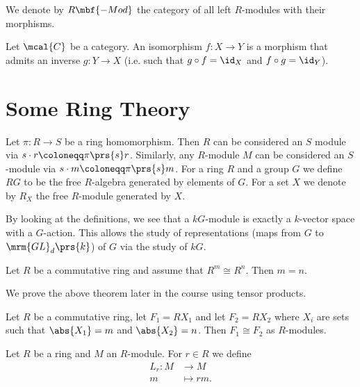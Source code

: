 \documentclass[11pt]{kbook}
\begin{document}
\begin{notation}
We denote by $R\mbf{-Mod}$ the category of all left $R$-modules with their morphisms.
\end{notation}

\begin{definition}[Isomorphism]
Let $\mcal{C}$ be a category. An isomorphism $f \colon X \to Y$ is a morphism that admits an inverse $g \colon Y \to X$ (i.e. such that $g \circ f = \id_X$ and $f \circ g = \id_Y$).
\end{definition}

\section{Some Ring Theory}

Let $\pi \colon R \to S$ be a ring homomorphism. Then $R$ can be considered an $S$ module via $s \cdot r \coloneqq \pi\prs{s} r$.
Similarly, any $R$-module $M$ can be considered an $S$-module via $s \cdot m \coloneqq \pi\prs{s} m$. For a ring $R$ and a group $G$ we define $RG$ to be the free $R$-algebra generated by elements of $G$. For a set $X$ we denote by $R_X$ the free $R$-module generated by $X$.

By looking at the definitions, we see that a $kG$-module is exactly a $k$-vector space with a $G$-action. This allows the study of representations (maps from $G$ to $\mrm{GL}_d\prs{k}$) of $G$ via the study of $kG$.

\begin{theorem}
Let $R$ be a commutative ring and assume that $R^m \cong R^n$. Then $m = n$.
\end{theorem}

We prove the above theorem later in the course using tensor products.

\begin{proposition}
Let $R$ be a commutative ring, let $F_1 = R X_1$ and let $F_2 = R X_2$ where $X_i$ are sets such that $\abs{X_1} = m$ and $\abs{X_2} = n$.
Then $F_1 \cong F_2$ as $R$-modules.
\end{proposition}

\begin{notation}
Let $R$ be a ring and $M$ an $R$-module. For $r \in R$ we define
\begin{align*}
L_r \colon M &\to M \\
m &\mapsto rm \text{.}
\end{align*}
\end{notation}
\end{document}
